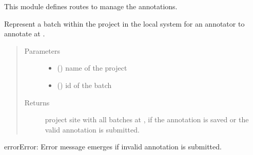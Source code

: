 \documentclass[a4paper,12pt,english]{sphinxmanual}
\begin{document}
This module defines routes to manage the annotations.

\begin{fulllineitems}
\label{\detokenize{project_rst/annotator_rst/routes:project.annotator.annotation.batch}}
Represent a batch within the project in the local system for an annotator
to annotate at .
\begin{quote}\begin{description}
\item[{Parameters}] \leavevmode\begin{itemize}
\item {} 
 () \textendash{} name of the project

\item {} 
 () \textendash{} id of the batch

\end{itemize}

\item[{Returns}] \leavevmode
project site with all batches at ,
if the annotation is saved or the valid annotation is submitted.

\end{description}\end{quote}

\begin{sphinxadmonition}{error}{Error:}
Error message emerges if invalid annotation is submitted.
\end{sphinxadmonition}

\end{fulllineitems}

\end{document}
